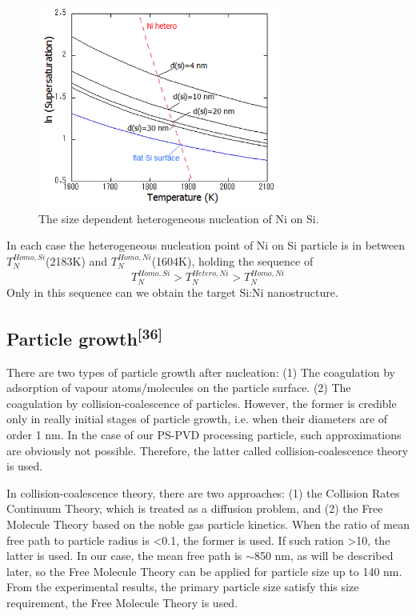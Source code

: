 \begin{figure}[H]
\centering
\includegraphics[width=8cm]{src/fig/fig35.png}
\caption{The size dependent heterogeneous nucleation of Ni on Si.}
\end{figure}
In each case the heterogeneous nucleation point of Ni on Si particle is in between $T_{N}^{Homo,Si}$(2183K) and $T_{N}^{Homo,Ni}$(1604K), 
holding the sequence of 
$$\boxed{T_{N}^{Homo,Si}>T_{N}^{Hetero,Ni}>T_{N}^{Homo,Ni}}$$
Only in this sequence can we obtain the target Si:Ni nanostructure.

\subsection{Particle growth\textsuperscript{[36]}}
There are two types of particle growth after nucleation: (1) The coagulation by adsorption of vapour atoms/molecules on the particle surface. (2) The coagulation by collision-coalescence of particles. However, the former is credible only in really initial stages of particle growth, i.e. when their diameters are of order 1 nm. In the case of our PS-PVD processing particle,  such approximations are obviously not possible. Therefore, the latter called collision-coalescence theory is used.

In collision-coalescence theory, there are two approaches: (1) the Collision Rates Continuum Theory, which is treated as a diffusion problem, and (2) the Free Molecule Theory based on the noble gas particle kinetics.  When the ratio of mean free path to particle radius is <0.1, the former is used.  If such ration >10, the latter is used. In our case, the mean free path is $\sim$850 nm, as will be described later, so the Free Molecule Theory can be applied for particle size up to 140 nm. From the experimental results, the primary particle size  satisfy this size requirement, the  Free Molecule Theory  is used.

